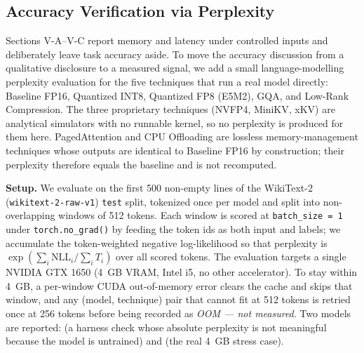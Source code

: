 \documentclass[conference]{IEEEtran}
\begin{document}
\subsection{Accuracy Verification via Perplexity}
\label{sec:perplexity}

Sections V-A--V-C report memory and latency under controlled inputs and deliberately leave task accuracy aside. To move the accuracy discussion from a qualitative disclosure to a measured signal, we add a small language-modelling perplexity evaluation for the five techniques that run a real model directly: Baseline FP16, Quantized INT8, Quantized FP8 (E5M2), GQA, and Low-Rank Compression. The three proprietary techniques (NVFP4, MiniKV, xKV) are analytical simulators with no runnable kernel, so no perplexity is produced for them here. PagedAttention and CPU Offloading are lossless memory-management techniques whose outputs are identical to Baseline FP16 by construction; their perplexity therefore equals the baseline and is not recomputed.

\noindent\textbf{Setup.} We evaluate on the first 500 non-empty lines of the WikiText-2 (\texttt{wikitext-2-raw-v1}) \texttt{test} split, tokenized once per model and split into non-overlapping windows of 512 tokens. Each window is scored at \texttt{batch\_size = 1} under \texttt{torch.no\_grad()} by feeding the token ids as both input and labels; we accumulate the token-weighted negative log-likelihood so that perplexity is $\exp\!\left(\sum_i \mathrm{NLL}_i / \sum_i T_i\right)$ over all scored tokens. The evaluation targets a single NVIDIA GTX 1650 (4~GB VRAM, Intel i5, no other accelerator). To stay within 4~GB, a per-window CUDA out-of-memory error clears the cache and skips that window, and any (model, technique) pair that cannot fit at 512 tokens is retried once at 256 tokens before being recorded as \emph{OOM --- not measured}. Two models are reported:  (a harness check whose absolute perplexity is not meaningful because the model is untrained) and  (the real 4~GB stress case).
\end{document}

